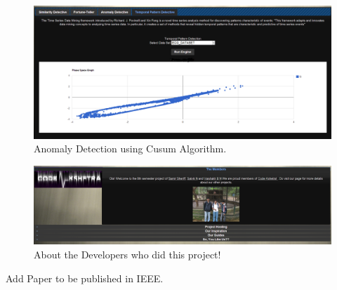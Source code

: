 \documentclass[12pt]{report}
\begin{document}
\begin{figure}[h!]
  
  \centering
    \includegraphics[scale=0.350]{./screenshots/temp_pattern.png}
\caption{Anomaly Detection using Cusum Algorithm.}
\end{figure}
\begin{figure}[h!]
  
  \centering
    \includegraphics[scale=0.35]{./screenshots/about_us.png}
\caption{About the Developers who did this project!}
\end{figure}

%
%


\newpage
\pagestyle{fancy}
\chead{}
\rfoot{\small{\thepage}}
\renewcommand{\headrulewidth}{0.4pt}
\renewcommand{\footrulewidth}{0.4pt}

Add Paper to be published in IEEE.
\end{document}
